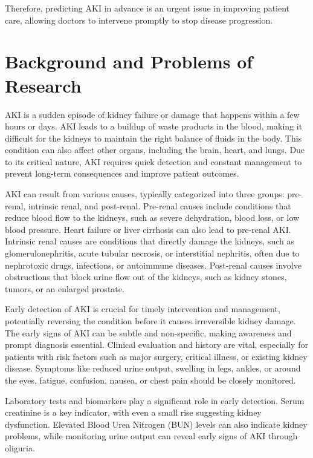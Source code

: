 \documentclass[../main.tex]{subfiles}
\begin{document}
Therefore, predicting \gls{AKI} in advance is an urgent issue in improving patient care, allowing doctors to intervene promptly to stop disease progression.



\section{Background and Problems of Research} 
\label{sec:giaiphap}

\gls{AKI} is a sudden episode of kidney failure or damage that happens within a few hours or days. 
AKI leads to a buildup of waste products in the blood, making it difficult for the kidneys to maintain the right balance of fluids in the body. 
This condition can also affect other organs, including the brain, heart, and lungs. Due to its critical nature, \gls{AKI} requires quick detection and constant management to prevent long-term consequences and improve patient outcomes.

AKI can result from various causes, typically categorized into three groups: pre-renal, intrinsic renal, and post-renal. 
Pre-renal causes include conditions that reduce blood flow to the kidneys, such as severe dehydration, blood loss, or low blood pressure. 
Heart failure or liver cirrhosis can also lead to pre-renal AKI.
Intrinsic renal causes are conditions that directly damage the kidneys, such as glomerulonephritis, acute tubular necrosis, or interstitial nephritis, often due to nephrotoxic drugs, infections, or autoimmune diseases. %
Post-renal causes involve obstructions that block urine flow out of the kidneys, such as kidney stones, tumors, or an enlarged prostate.
 
Early detection of \gls{AKI} is crucial for timely intervention and management, potentially reversing the condition before it causes irreversible kidney damage. 
The early signs of \gls{AKI} can be subtle and non-specific, making awareness and prompt diagnosis essential. 
Clinical evaluation and history are vital, especially for patients with risk factors such as major surgery, critical illness, or existing kidney disease. 
Symptoms like reduced urine output, swelling in legs, ankles, or around the eyes, fatigue, confusion, nausea, or chest pain should be closely monitored.

Laboratory tests and biomarkers play a significant role in early detection. 
Serum creatinine is a key indicator, with even a small rise suggesting kidney dysfunction. 
Elevated Blood Urea Nitrogen (BUN) levels can also indicate kidney problems, while monitoring urine output can reveal early signs of \gls{AKI} through oliguria. 
\end{document}
